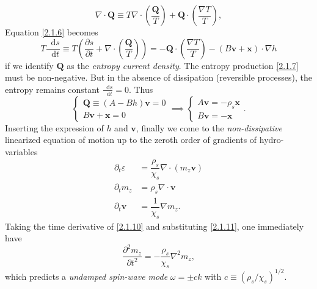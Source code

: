 \documentclass[10pt,nofootinbib,letterpaper]{revtex4}
\newcommand*\dd{\mathop{}\!\mathrm{d}}
\begin{document}
			\begin{equation*}
				\nabla\cdot\bm{Q}\equiv T\nabla\cdot \left(\dfrac{\bm{Q}}{T}\right)+\bm{Q}\cdot \left(\dfrac{\nabla T}{T}\right),  
			\end{equation*}
			Equation \eqref{2.1.6} becomes
			\begin{equation}\label{2.1.7}
				T\dfrac{\dd s}{\dd t}\equiv T \left(\dfrac{\partial s}{\partial t}+\nabla\cdot \left(\dfrac{\bm{Q}}{T}\right) \right)=-\bm{Q}\cdot \left(\dfrac{\nabla T}{T}\right)-(B\bm{v}+\bm{x})\cdot\nabla h
			\end{equation}
			if we identify $\bm{Q}$ as the \emph{entropy current density}. The entropy production \eqref{2.1.7} must be non-negative. But in the absence of dissipation (reversible processes), the entropy remains constant $\frac{\dd s}{\dd t}=0$. Thus
			\begin{equation}\label{2.1.8}
				\begin{cases}
					\bm{Q}\equiv (A-Bh)\bm{v}=0\\
					B\bm{v}+\bm{x}=0
				\end{cases}\implies
				\begin{cases}
					A\bm{v}=-\rho_s\bm{x}\\
					B\bm{v}=-\bm{x}
				\end{cases}.
			\end{equation}
			Inserting the expression of $h$ and $\bm{v}$, finally we come to the \emph{non-dissipative} linearized equation of motion up to the zeroth order of gradients of hydro-variables
			\begin{align}
				\partial_t\varepsilon&=\dfrac{\rho_s}{\chi_s}\nabla\cdot(m_z\bm{v})\label{2.1.9}\\
				\partial_t m_z&=\rho_s\nabla\cdot\bm{v}\label{2.1.10}\\
				\partial_t \bm{v}&=\dfrac{1}{\chi_s}\nabla m_z\label{2.1.11}.
			\end{align}
			Taking the time derivative of \eqref{2.1.10} and substituting \eqref{2.1.11}, one immediately have
			\begin{equation}\label{2.1.12}
				\dfrac{\partial^2 m_z}{\partial t^2}=-\dfrac{\rho_s}{\chi_s}\nabla^2m_z,
			\end{equation}
			which predicts a \emph{undamped spin-wave mode} $\omega=\pm ck$ with $c\equiv(\rho_s/\chi_s)^{1/2}$.
\end{document}
